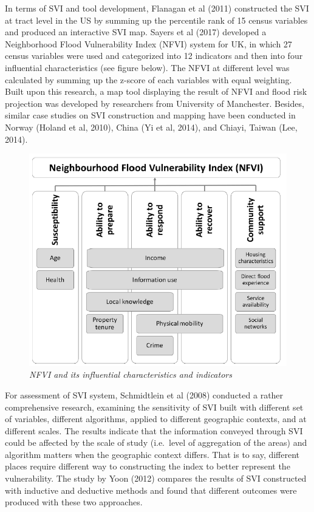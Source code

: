 \documentclass[]{article}
\begin{document}
In terms of SVI and tool development, Flanagan et al (2011) constructed
the SVI at tract level in the US by summing up the percentile rank of 15
census variables and produced an interactive SVI map. Sayers et al
(2017) developed a Neighborhood Flood Vulnerability Index (NFVI) system
for UK, in which 27 census variables were used and categorized into 12
indicators and then into four influential characteristics (see figure
below). The NFVI at different level was calculated by summing up the
z-score of each variables with equal weighting. Built upon this
research, a map tool displaying the result of NFVI and flood risk
projection was developed by researchers from University of Manchester.
Besides, similar case studies on SVI construction and mapping have been
conducted in Norway (Holand et al, 2010), China (Yi et al, 2014), and
Chiayi, Taiwan (Lee, 2014).

\begin{figure}
\centering
\includegraphics{Part3/pngs/litrevsvi.png}
\caption{\emph{NFVI and its influential characteristics and indicators}}
\end{figure}

For assessment of SVI system, Schmidtlein et al (2008) conducted a
rather comprehensive research, examining the sensitivity of SVI built
with different set of variables, different algorithms, applied to
different geographic contexts, and at different scales. The results
indicate that the information conveyed through SVI could be affected by
the scale of study (i.e.~level of aggregation of the areas) and
algorithm matters when the geographic context differs. That is to say,
different places require different way to constructing the index to
better represent the vulnerability. The study by Yoon (2012) compares
the results of SVI constructed with inductive and deductive methods and
found that different outcomes were produced with these two approaches.
\end{document}
